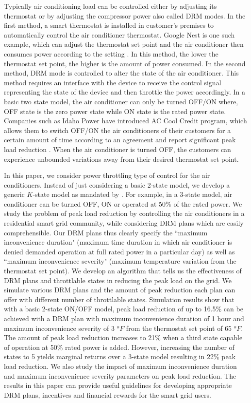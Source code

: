 \documentclass[10pt,twocolumn,twoside]{IEEEtran}
\begin{document}
Typically air conditioning load can be controlled either by adjusting its thermostat or by adjusting the compressor power also called DRM modes. In the first method, a smart thermostat is installed in customer's premises to automatically control the air conditioner thermostat. Google Nest is one such example, which can adjust the thermostat set point and the air conditioner then consumes power according to the setting \cite{googlenest}. In this method, the lower the thermostat set point, the higher is the amount of power consumed. In the second method, DRM mode is controlled to alter the state of the air conditioner. This method requires an interface with the device to receive the control signal representing the state of the device and then throttle the power accordingly. In a basic two state model, the air conditioner can only be turned OFF/ON where, OFF state is the zero power state while ON state is the rated power state. Companies such as Idaho Power have introduced AC Cool Credit program, which allows them to switch OFF/ON the air conditioners of their customers for a certain amount of time according to an agreement and report significant peak load reduction \cite{idaho}. When the air conditioner is turned OFF, the customers can experience unbounded variations away from their desired thermostat set point. 


In this paper, we consider power throttling type of control for the air conditioners. Instead of just considering a basic 2-state model, we develop a generic $K$-state model as mandated by \cite{aus_stand}. For example, in a 3-state model, air conditioner can be turned OFF, ON or operated at 50\% of the rated power. We study the problem of peak load reduction by controlling the air conditioners in a residential smart grid community, while considering DRM plans which are easily comprehensible. Our DRM plans thus clearly specify the ``maximum inconvenience duration" (maximum time duration in which air conditioner is denied demanded operation at full rated power in a particular day) as well as ``maximum inconvenience severity" (maximum temperature variation from the thermostat set point). We develop an algorithm that tells us the effectiveness of DRM plans and throttlable states in reducing the peak load on the grid. We simulate various DRM plans and the amount of peak reduction each plan can offer with different number of throttlable states. Simulation results show that with a basic 2-state ON/OFF model, peak load reduction of up to 16.5\% can be achieved with a DRM plan with maximum inconvenience duration of 1 hour and maximum inconvenience severity of 3 $^oF$ from the thermostat set point of 65 $^oF$. The amount of peak load reduction increases to 21\% when a third state capable of operation at 50\% rated power is added. However, increasing the number of states to 5 yields marginal returns over a 3-state model resulting in 22\% peak load reduction. We also study the impact of maximum inconvenience duration and maximum inconvenience severity parameters on peak load reduction. The results in this paper can provide useful guidelines for developing appropriate DRM plans, incentives and financial rewards for the smart grid users.
\end{document}

